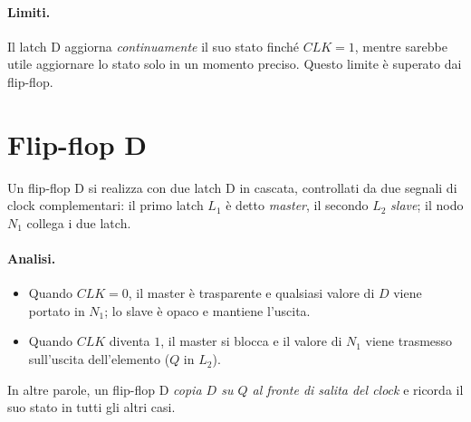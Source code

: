 \documentclass[11pt,a4paper]{article}
\begin{document}
\paragraph{Limiti.} Il latch D aggiorna \emph{continuamente} il suo stato finché $CLK = 1$, mentre sarebbe utile aggiornare lo stato solo in un momento preciso. Questo limite è superato dai flip-flop.

\section{Flip-flop D}

Un flip-flop D si realizza con due latch D in cascata, controllati da due segnali di clock complementari: il primo latch $L_1$ è detto \emph{master}, il secondo $L_2$ \emph{slave}; il nodo $N_1$ collega i due latch.

\begin{center}
\end{center}

\paragraph{Analisi.}
\begin{itemize}
  \item Quando $CLK = 0$, il master è trasparente e qualsiasi valore di $D$ viene portato in $N_1$; lo slave è opaco e mantiene l'uscita.
  \item Quando $CLK$ diventa $1$, il master si blocca e il valore di $N_1$ viene trasmesso sull'uscita dell'elemento ($Q$ in $L_2$).
\end{itemize}
In altre parole, un flip-flop D \emph{copia $D$ su $Q$ al fronte di salita del clock} e ricorda il suo stato in tutti gli altri casi.
\end{document}
